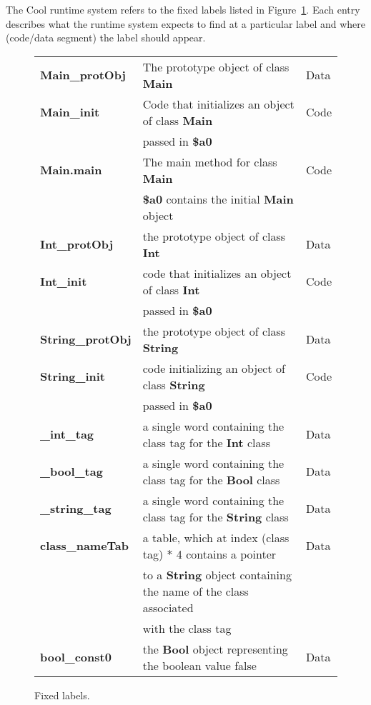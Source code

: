 \documentclass[11pt]{article}
\def\C#1{{\bf{}#1}}
\begin{document}
The Cool runtime system refers to the fixed labels listed in
Figure~\ref{fig10}.  Each entry describes what the runtime system
expects to find at a particular label and where (code/data segment)
the label should appear.

\begin{figure}
\begin{center}
\begin{tabular}{|l|l|l|}
\hline
\C{Main\_protObj}	& The prototype object of class \C{Main}	& Data\\
\C{Main\_init}	& Code that initializes an object of class \C{Main} &
Code\\
		& passed in \C{\$a0} &\\
\C{Main.main}	& The main method for class \C{Main}	& Code\\
		& \C{\$a0} contains the initial \C{Main} object & \\
\C{Int\_protObj}	& the prototype object of class \C{Int}	& Data\\
\C{Int\_init}	& code that initializes an object of class \C{Int} &
Code\\
		& passed in \C{\$a0} 	&\\
\C{String\_protObj}	& the prototype object of class \C{String}	& Data\\
\C{String\_init}	& code initializing an object of class \C{String} &
Code\\
		& passed in \C{\$a0} 	&\\
\C{\_int\_tag}	& a single word containing the class tag for the \C{Int}
class & Data\\
\C{\_bool\_tag}	& a single word containing the class tag for the \C{Bool}
class & Data\\
\C{\_string\_tag}	& a single word containing the class tag for the \C{String}
class & Data\\
\C{class\_nameTab}	& a table, which at index (class tag) $\ast$ 4 contains a pointer  & Data \\
		&  to a \C{String} object containing the name of the class
associated &\\
		&  with the class tag &\\
\C{bool\_const0}	& the \C{Bool} object representing the boolean value false & Data\\
\hline
\end{tabular}
\end{center}
\caption{Fixed labels.}
\label{fig10}
\end{figure}
\end{document}
